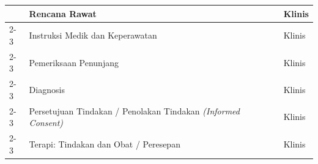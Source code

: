 \begin{longtable}{|p{4cm}|p{5.2cm}|p{3.2cm}|}
	                              & Rencana Rawat
	                              & Klinis                                                                \\ \cline{2-3}

	                              & Instruksi Medik dan Keperawatan
	                              & Klinis                                                                \\ \cline{2-3}

	                              & Pemeriksaan Penunjang
	                              & Klinis                                                                \\ \cline{2-3}



	                              & Diagnosis
	                              & Klinis                                                                \\ \cline{2-3}

	                              & Persetujuan Tindakan / Penolakan Tindakan \textit{(Informed Consent)}
	                              & Klinis                                                                \\ \cline{2-3}

	                              & Terapi: Tindakan dan Obat / Peresepan
	                              & Klinis                                                                \\ \hline
\end{longtable}

